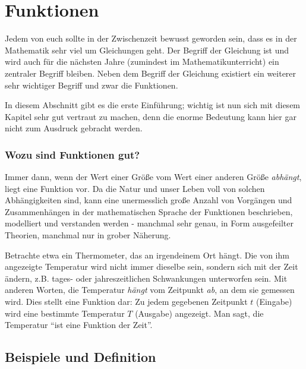 \documentclass[a4paper, twoside, parskip, 10pt, smallheadings]{scrbook}
\theoremstyle{plain}
\theoremstyle{definition}
\begin{document}
\chapter{Funktionen} 

Jedem von euch sollte in der Zwischenzeit bewusst geworden sein, dass es in der Mathematik sehr viel um
Gleichungen geht. Der Begriff der Gleichung ist und wird auch f\"{u}r die n\"{a}chsten Jahre (zumindest im
Mathematikunterricht) ein zentraler Begriff bleiben. Neben dem Begriff der Gleichung existiert ein weiterer
sehr wichtiger Begriff und  zwar die Funktionen.

In diesem Abschnitt gibt es die erste Einführung;  wichtig ist nun sich mit diesem Kapitel sehr gut vertraut
zu machen, denn die enorme Bedeutung kann hier gar nicht zum Ausdruck gebracht werden.


\subsection*{Wozu sind Funktionen gut?}





Immer dann, wenn der Wert einer Größe vom Wert einer anderen Größe {\it abhängt}, liegt eine Funktion vor. Da die Natur und unser Leben voll von solchen Abhängigkeiten sind, kann eine unermesslich große Anzahl von Vorgängen und Zusammenhängen in der mathematischen Sprache der Funktionen beschrieben, modelliert und verstanden werden - manchmal sehr genau, in Form ausgefeilter Theorien, manchmal nur in grober Näherung. 

Betrachte  etwa ein Thermometer, das an irgendeinem Ort hängt. Die von ihm angezeigte Temperatur wird nicht immer dieselbe sein, sondern sich mit der Zeit ändern, z.B. tages- oder jahreszeitlichen Schwankungen unterworfen sein. Mit anderen Worten, die Temperatur {\it hängt} vom Zeitpunkt {\it ab}, an dem sie gemessen wird. Dies stellt  eine Funktion dar: Zu jedem gegebenen Zeitpunkt $t$ (Eingabe) wird eine bestimmte Temperatur $T$ (Ausgabe) angezeigt. Man sagt, die Temperatur "`ist eine Funktion der Zeit"'.




\section{Beispiele und Definition}
\end{document}
